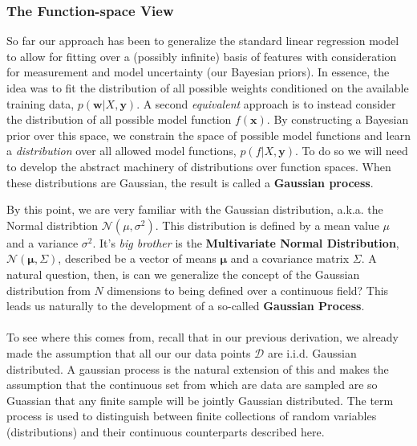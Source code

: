 \subsubsection{The Function-space View}

So far our approach has been to generalize the standard linear regression model to allow for fitting over a (possibly infinite) basis of features with consideration for measurement and model uncertainty (our Bayesian priors). In essence, the idea was to fit the distribution of all possible weights conditioned on the available training data, $p(\mathbf{w} \vert X, \mathbf{y})$. A second \textit{equivalent} approach is to instead consider the distribution of all possible model function $f(\mathbf{x})$. By constructing a Bayesian prior over this space, we constrain the space of possible model functions and learn a \textit{distribution} over all allowed model functions, $p(f \vert X, \mathbf{y})$. To do so we will need to develop the abstract machinery of distributions over function spaces. When these distributions are Gaussian, the result is called a \textbf{Gaussian process}.

By this point, we are very familiar with the Gaussian distribution, a.k.a. the Normal distribtion $\mathcal{N}(\mu, \sigma^2)$. This distribution is defined by a mean value $\mu$ and a variance $\sigma^2$. It's \textit{big brother} is the \textbf{Multivariate Normal Distribution}, $\mathcal{N}(\mathbf{\mu}, \Sigma)$, described be a vector of means $\mathbf{\mu}$ and a covariance matrix $\Sigma$. A natural question, then, is can we generalize the concept of the Gaussian distribution from $N$ dimensions to being defined over a continuous field? This leads us naturally to the development of a so-called \textbf{Gaussian Process}.\\

\\


To see where this comes from, recall that in our previous derivation, we already made the assumption that all our our data points $\mathcal{D}$ are i.i.d. Gaussian distributed. A gaussian process is the natural extension of this and makes the assumption that the continuous set from which are data are sampled are so Guassian that any finite sample will be jointly Gaussian distributed. The term process is used to distinguish between finite collections of random variables (distributions) and their continuous counterparts described here.

